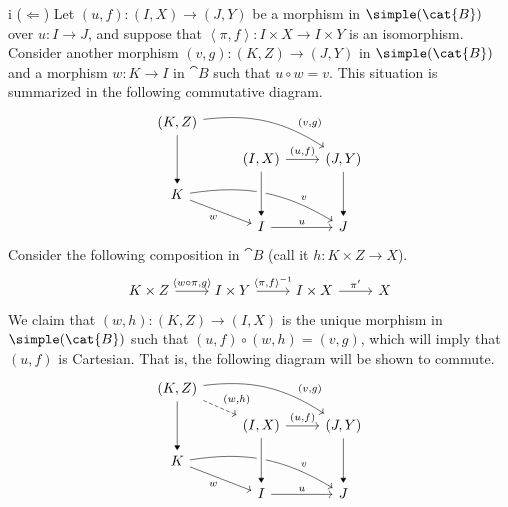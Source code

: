 \begin{partsolution}{i}
(\(\Longleftarrow\))
Let \((u, f) : (I, X) \to (J, Y)\) be a morphism in \(\simple(\cat{B})\) over \(u : I \to J\), and suppose that \(\left\langle\pi, f\right\rangle : I \times X \to I \times Y\) is an isomorphism.
Consider another morphism \((v, g) : (K, Z) \to (J, Y)\) in \(\simple(\cat{B})\) and a morphism \(w : K \to I\) in \(\cat{B}\) such that \(u \circ w = v\).
This situation is summarized in the following commutative diagram.
\begin{equation*}
\begin{tikzcd}[row sep=small]
{(K, Z)} \arrow[dd, -Triangle] \arrow[drr, bend left=20, near end, "{(v, g)}"{above right}] \\
& {(I, X)} \arrow[dd, -Triangle] \arrow[r, "{(u, f)}"{above}]
& {(J, Y)} \arrow[dd, -Triangle] \\
K \arrow[dr, "w"{below left}] \arrow[drr, bend left=20, near end, "v"{above right}] \\
& I \arrow[r, "u"]
& J
\arrow[from=uul, to=l, -Triangle, crossing over]
\end{tikzcd}
\end{equation*}
Consider the following composition in \(\cat{B}\) (call it \(h : K \times Z \to X\)).
\begin{equation*}
\begin{tikzcd}
K \times Z \arrow[r, "{\left\langle w \circ \pi, g\right\rangle}"]
& I \times Y \arrow[r, "{\left\langle\pi, f\right\rangle^{-1}}"]
& I \times X \arrow[r, "{\pi^\prime}"]
& X
\end{tikzcd}
\end{equation*}
We claim that \((w, h) : (K, Z) \to (I, X)\) is the unique morphism in \(\simple(\cat{B})\) such that \((u, f) \circ (w, h) = (v, g)\), which will imply that \((u, f)\) is Cartesian.
That is, the following diagram will be shown to commute.
\begin{equation*}
\begin{tikzcd}[row sep=small]
{(K, Z)} \arrow[dd, -Triangle] \arrow[drr, bend left=20, near end, "{(v, g)}"{above right}] \arrow[dr, dashed, "{(w, h)}"{above right}] \\
& {(I, X)} \arrow[dd, -Triangle] \arrow[r, "{(u, f)}"{above}]
& {(J, Y)} \arrow[dd, -Triangle] \\
K \arrow[dr, "w"{below left}] \arrow[drr, bend left=20, near end, "v"{above right}] \\
& I \arrow[r, "u"]
& J
\arrow[from=uul, to=l, -Triangle, crossing over]
\end{tikzcd}
\end{equation*}

\end{partsolution}
